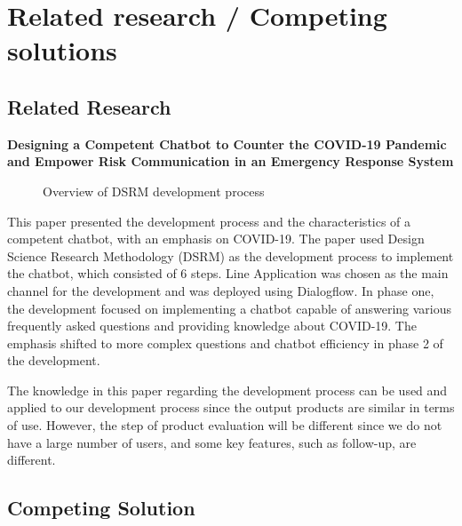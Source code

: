 \documentclass[12pt,oneside,openright,a4paper]{cpe-english-project}
\begin{document}
  \section{Related research / Competing solutions}
    \subsection{Related Research}
      \qquad \textbf{Designing a Competent Chatbot to Counter the COVID-19 Pandemic and Empower Risk Communication in an Emergency Response System}\par
      \begin{figure}[!h]
        \centering
        \caption{Overview of DSRM development process\cite{relatedwork1}}\label{fig:Research_1}
      \end{figure}
      \qquad This paper presented the development process and the characteristics of a competent chatbot, with an emphasis on COVID-19. The paper used Design Science Research Methodology (DSRM) as the development process to implement the chatbot, which consisted of 6 steps. Line Application was chosen as the main channel for the development and was deployed using Dialogflow. In phase one, the development focused on implementing a chatbot capable of answering various frequently asked questions and providing knowledge about COVID-19. The emphasis shifted to more complex questions and chatbot efficiency in phase 2 of the development.\par
      \qquad The knowledge in this paper regarding the development process can be used and applied to our development process since the output products are similar in terms of use. However, the step of product evaluation will be different since we do not have a large number of users, and some key features, such as follow-up, are different.\par
    \newpage
      \subsection{Competing Solution}
\end{document}
